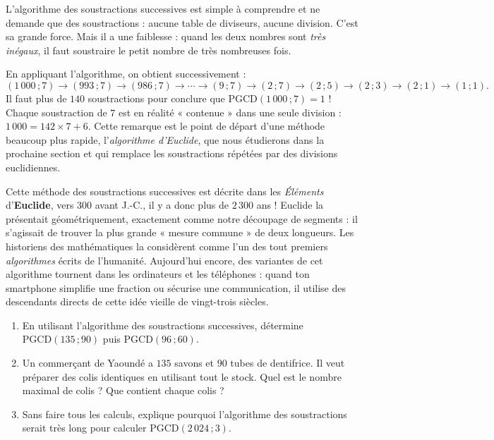 \documentclass[11pt]{article}
\newcounter{popsec}
\newcounter{popsub}
\newcommand{\courssub}[1]{%
  \stepcounter{popsub}%
  \par\vspace{9pt}\noindent{\popxbold\fontsize{11.5}{13}\selectfont\color{popink}{\color{poporange}\thepopsec.\thepopsub}\hspace{6pt}#1}\par\nopagebreak\vspace{4pt}
}
\begin{document}
\courssub{Efficacité et limite de la méthode}

L'algorithme des soustractions successives est simple à comprendre et ne demande que des soustractions : aucune table de diviseurs, aucune division. C'est sa grande force. Mais il a une faiblesse : quand les deux nombres sont \emph{très inégaux}, il faut soustraire le petit nombre de très nombreuses fois.

\begin{exemplebox}
En appliquant l'algorithme, on obtient successivement :
\[ (1\,000\,;7) \to (993\,;7) \to (986\,;7) \to \cdots \to (9\,;7) \to (2\,;7) \to (2\,;5) \to (2\,;3) \to (2\,;1) \to (1\,;1). \]
Il faut plus de $140$ soustractions pour conclure que $\mathrm{PGCD}(1\,000\,;7) = 1$ ! Chaque soustraction de $7$ est en réalité « contenue » dans une seule division : $1\,000 = 142 \times 7 + 6$. Cette remarque est le point de départ d'une méthode beaucoup plus rapide, l'\emph{algorithme d'Euclide}, que nous étudierons dans la prochaine section et qui remplace les soustractions répétées par des divisions euclidiennes.
\end{exemplebox}

\begin{savaistu}
Cette méthode des soustractions successives est décrite dans les \emph{Éléments} d'\textbf{Euclide}, vers $300$ avant J.-C., il y a donc plus de $2\,300$ ans ! Euclide la présentait géométriquement, exactement comme notre découpage de segments : il s'agissait de trouver la plus grande « mesure commune » de deux longueurs. Les historiens des mathématiques la considèrent comme l'un des tout premiers \emph{algorithmes} écrits de l'humanité. Aujourd'hui encore, des variantes de cet algorithme tournent dans les ordinateurs et les téléphones : quand ton smartphone simplifie une fraction ou sécurise une communication, il utilise des descendants directs de cette idée vieille de vingt-trois siècles.
\end{savaistu}

\begin{exercice}
\begin{enumerate}
\item En utilisant l'algorithme des soustractions successives, détermine $\mathrm{PGCD}(135\,;90)$ puis $\mathrm{PGCD}(96\,;60)$.
\item Un commerçant de Yaoundé a $135$ savons et $90$ tubes de dentifrice. Il veut préparer des colis identiques en utilisant tout le stock. Quel est le nombre maximal de colis ? Que contient chaque colis ?
\item Sans faire tous les calculs, explique pourquoi l'algorithme des soustractions serait très long pour calculer $\mathrm{PGCD}(2\,024\,;3)$.
\end{enumerate}
\end{exercice}
\end{document}
